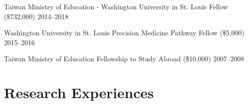 \documentclass[letterpaper,11pt]{cv}
\begin{document}
\begin{entrylist}

\item Taiwan Ministry of Education - Washington University in St. Louis Fellow (\$732,000) \hfill
    2014--2018 \\
\item Washington University in St. Louis Precision Medicine Pathway Fellow (\$5,000) \hfill
    2015--2016 \\
\item Taiwan Ministry of Education Fellowship to Study Abroad (\$10,000) \hfill
    2007--2008 \\

\end{entrylist}

\section{Research Experiences}
\justifying
\end{document}
